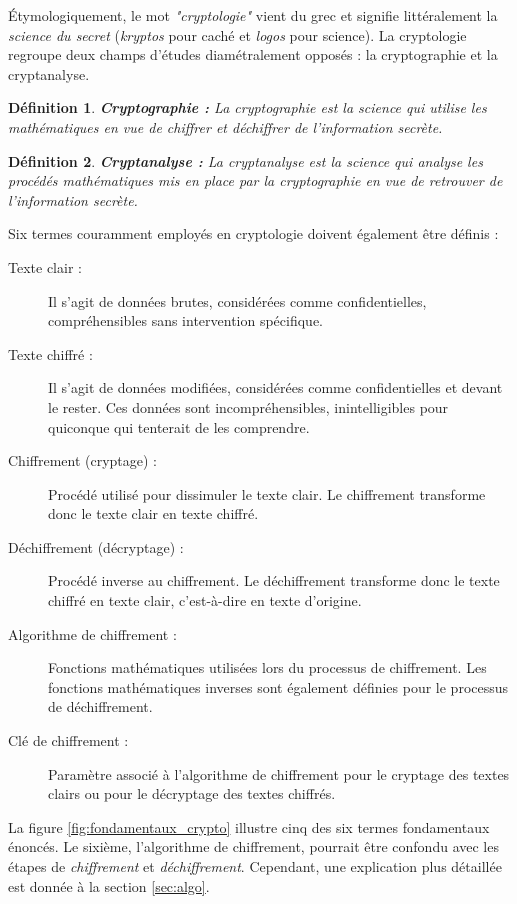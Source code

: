 \documentclass[oneside]{book}
\newtheorem{definition}{Définition}[section]
\begin{document}
Étymologiquement, le mot \textit{"cryptologie"} vient du grec et signifie littéralement la \textit{science du secret} (\textit{kryptos}  pour caché et \textit{logos} pour science). La cryptologie regroupe deux champs d'études diamétralement opposés : la cryptographie et la cryptanalyse.

\theoremstyle{definition}
\begin{definition}{\textbf{Cryptographie : }}
La cryptographie est la science qui utilise les mathématiques en vue de chiffrer et déchiffrer de l'information secrète.
\end{definition}

\begin{definition}{\textbf{Cryptanalyse : }}
La cryptanalyse est la science qui analyse les procédés mathématiques mis en place par la cryptographie en vue de retrouver de l'information secrète. 
\end{definition}

\hspace{-0.5cm}Six termes couramment employés en cryptologie doivent également être définis : 
\begin{description}
\item[Texte clair :] Il s'agit de données brutes, considérées comme confidentielles, compréhensibles sans intervention spécifique.
\item[Texte chiffré :] Il s'agit de données modifiées, considérées comme confidentielles et devant le rester. Ces données sont incompréhensibles, inintelligibles pour quiconque qui tenterait de les comprendre. 
\item[Chiffrement (cryptage) :] Procédé utilisé pour dissimuler le texte clair. Le chiffrement transforme donc le texte clair en texte chiffré.
\item[Déchiffrement (décryptage) :] Procédé inverse au chiffrement. Le déchiffrement transforme donc le texte chiffré en texte clair, c'est-à-dire en texte d'origine.
\item[Algorithme de chiffrement :] Fonctions mathématiques utilisées lors du processus de chiffrement. Les fonctions mathématiques inverses sont également définies pour le processus de déchiffrement.
\item[Clé de chiffrement :] Paramètre associé à l'algorithme de chiffrement pour le cryptage des textes clairs ou pour le décryptage des textes chiffrés. \\
\end{description}

\hspace{-0.5cm}La figure \ref{fig:fondamentaux_crypto} illustre cinq des six termes fondamentaux énoncés. Le sixième, l'algorithme de chiffrement, pourrait être confondu avec les étapes de \textit{chiffrement} et \textit{déchiffrement}. Cependant, une explication plus détaillée est donnée à la section \ref{sec:algo}.
\end{document}
